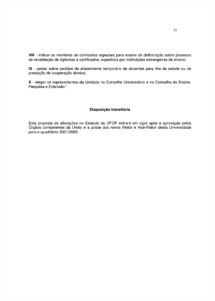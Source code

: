 \begin{figure}[p]
	\centering 
	\includegraphics[scale=0.7]{capitulos/resolucoes/cuni414/cuni414-33.pdf}
\end{figure} \pagebreak


